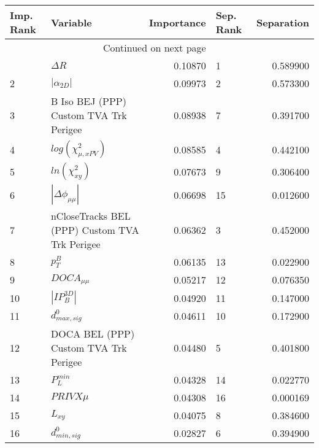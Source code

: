 \usepackage{lscape}

\begin{landscape}
\begin{longtable}{llrlr}
\toprule
Imp. Rank &                                       Variable &  Importance & Sep. Rank &  Separation \\
\midrule
\endhead
\midrule
\multicolumn{3}{r}{{Continued on next page}} \\
\midrule
\endfoot

\bottomrule
\endlastfoot
        1 &                                     $\Delta R$ &     0.10870 &         1 &    0.589900 \\
        2 &                                $|\alpha_{2D}|$ &     0.09973 &         2 &    0.573300 \\
        3 &         B Iso BEJ (PPP) Custom TVA Trk Perigee &     0.08938 &         7 &    0.391700 \\
        4 &                      $log(\chi^{2}_{\mu,xPV})$ &     0.08585 &         4 &    0.442100 \\
        5 &                            $ln(\chi^{2}_{xy})$ &     0.07673 &         9 &    0.306400 \\
        6 &                       $|\Delta \phi_{\mu\mu}|$ &     0.06698 &        15 &    0.012600 \\
        7 &  nCloseTracks BEL (PPP) Custom TVA Trk Perigee &     0.06362 &         3 &    0.452000 \\
        8 &                                      $p^B_{T}$ &     0.06135 &        13 &    0.022900 \\
        9 &                                $DOCA_{\mu\mu}$ &     0.05217 &        12 &    0.076350 \\
       10 &                                $|IP_{B}^{3D}|$ &     0.04920 &        11 &    0.147000 \\
       11 &                               $d^0_{max, sig}$ &     0.04611 &        10 &    0.172900 \\
       12 &          DOCA BEL (PPP) Custom TVA Trk Perigee &     0.04480 &         5 &    0.401800 \\
       13 &                                  $P^{min}_{L}$ &     0.04328 &        14 &    0.022770 \\
       14 &                                     $PRIVX\mu$ &     0.04308 &        16 &    0.000169 \\
       15 &                                       $L_{xy}$ &     0.04075 &         8 &    0.384600 \\
       16 &                               $d^0_{min, sig}$ &     0.02827 &         6 &    0.394900 \\
\end{longtable}

\end{landscape}
